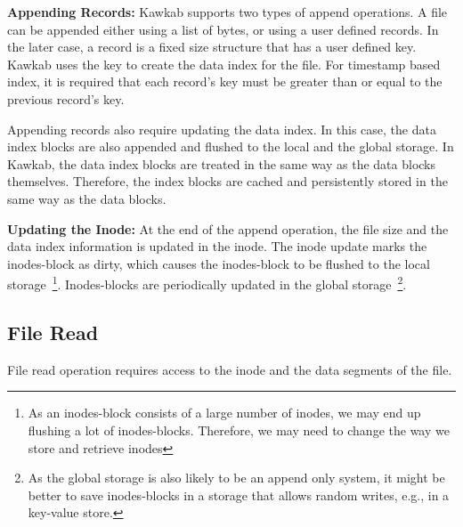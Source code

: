 \documentclass[]{article}
\newcommand{\subtopic}[1]{\vspace{1.5pt} \noindent \textbf{#1}}
\begin{document}
\subtopic{Appending Records:} Kawkab supports two types of append operations. A
file can be appended either using a list of bytes, or using a user defined
records.%
In the later case, a record is a fixed size structure that has a user defined
key. Kawkab uses the key to create the data index for the file. For timestamp
based index, it is required that each record's key must be greater than or
equal to the previous record's key.

Appending records also require updating the data index. In this case, the
data index blocks are also appended and flushed to the local and the
global storage. In Kawkab, the data index blocks are treated in the
same way as the data blocks themselves. Therefore, the index blocks
are cached and persistently stored in the same way as the data blocks.


\subtopic{Updating the Inode:} At the end of the append operation, the file
size and the data index information is updated in the inode. The inode
update marks the inodes-block as dirty, which causes the inodes-block
to be flushed to the local storage~\footnote{As an inodes-block consists of
a large number of inodes, we may end up flushing a lot of inodes-blocks. Therefore,
we may need to change the way we store and retrieve inodes}. Inodes-blocks
are periodically updated in the global storage~\footnote{As the global storage
is also likely to be an append only system, it might be better to save inodes-blocks
in a storage that allows random writes, e.g., in a key-value store.}.




\subsection{File Read}

File read operation requires access to the inode and the data segments of the
file. 
\end{document}
